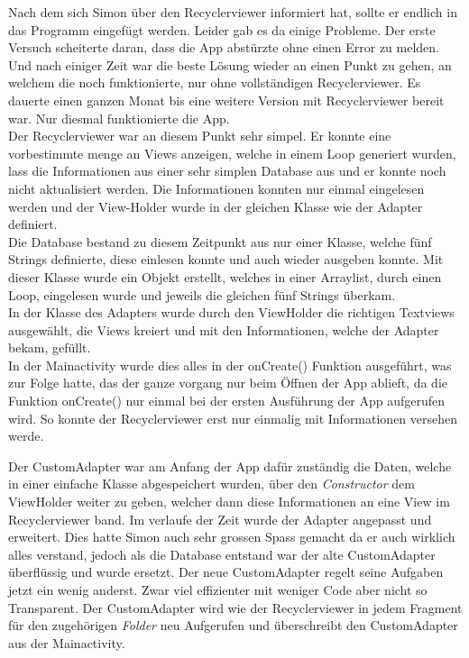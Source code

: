 \documentclass[a4paper,11pt]{article}
\begin{document}

Nach dem sich Simon über den Recyclerviewer informiert hat, sollte er endlich in das Programm eingefügt werden. Leider gab es da einige Probleme. Der erste Versuch scheiterte daran,
dass die App abstürzte ohne einen Error zu melden. Und nach einiger Zeit war die beste Lösung wieder an einen Punkt zu gehen, an welchem die noch funktionierte, nur ohne vollständigen 
Recyclerviewer. Es dauerte einen ganzen Monat bis eine weitere Version mit Recyclerviewer bereit war. Nur diesmal funktionierte die App. \\

Der Recyclerviewer war an diesem Punkt sehr simpel. Er konnte eine vorbestimmte menge an Views anzeigen, welche in einem Loop generiert wurden, lass die Informationen aus
einer sehr simplen Database aus und er konnte noch nicht aktualisiert werden. Die Informationen konnten nur einmal eingelesen werden und der View-Holder wurde in der gleichen Klasse wie 
der Adapter definiert. \\

Die Database bestand zu diesem Zeitpunkt aus nur einer Klasse, welche fünf Strings definierte, diese einlesen konnte und auch wieder ausgeben konnte. Mit dieser Klasse wurde
ein Objekt erstellt, welches in einer Arraylist, durch einen Loop, eingelesen wurde und jeweils die gleichen fünf Strings überkam. \\

In der Klasse des Adapters wurde durch den ViewHolder die richtigen Textviews ausgewählt, die Views kreiert und mit den Informationen, welche der Adapter bekam, gefüllt. \\

In der Mainactivity wurde dies alles in der onCreate() Funktion ausgeführt, was zur Folge hatte, das der ganze vorgang nur beim Öffnen der App ablieft, da die Funktion onCreate()
nur einmal bei der ersten Ausführung der App aufgerufen wird. So konnte der Recyclerviewer erst nur einmalig mit Informationen versehen werde.

Der CustomAdapter war am Anfang der App dafür zuständig die Daten, welche in einer einfache Klasse abgespeichert wurden, über den 
\textit{Constructor} dem ViewHolder weiter zu geben, welcher dann diese Informationen an eine View im Recyclerviewer band. Im verlaufe der Zeit wurde 
der Adapter angepasst und erweitert. Dies hatte Simon auch sehr grossen Spass gemacht da er auch wirklich alles verstand, jedoch als die Database entstand war der alte 
CustomAdapter überflüssig und wurde ersetzt. Der neue CustomAdapter regelt seine Aufgaben jetzt ein wenig anderst. Zwar viel effizienter mit weniger Code aber nicht 
so Transparent. Der CustomAdapter wird wie der Recyclerviewer in jedem Fragment für den zugehörigen \textit{Folder} neu Aufgerufen und überschreibt den CustomAdapter 
aus der Mainactivity. 
\end{document}
